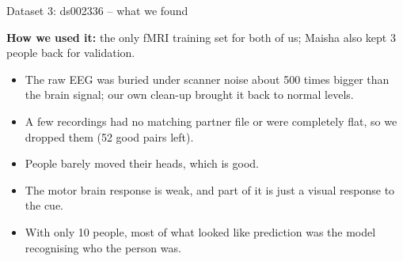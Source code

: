 \documentclass[aspectratio=169,11pt]{beamer}
\begin{document}
\begin{frame}{Dataset 3: ds002336 -- what we found}
\begin{slidebox}
\small
\textbf{How we used it:} the only fMRI training set for both of us; Maisha also kept 3 people back for validation.
\begin{itemize}\setlength{\itemsep}{3pt}
  \item The raw EEG was buried under scanner noise about 500 times bigger than the brain signal; our own clean-up brought it back to normal levels.
  \item A few recordings had no matching partner file or were completely flat, so we dropped them (52 good pairs left).
  \item People barely moved their heads, which is good.
  \item The motor brain response is weak, and part of it is just a visual response to the cue.
  \item With only 10 people, most of what looked like prediction was the model recognising who the person was.
\end{itemize}
\end{slidebox}
\end{frame}
\end{document}
